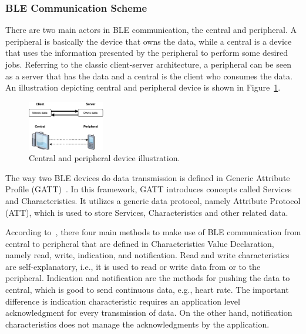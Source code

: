 \documentclass[journal]{vgtc}                %
\begin{document}


\subsubsection{BLE Communication Scheme} %
\label{ssub:ble_communication_scheme}
There are two main actors in BLE communication, the central and peripheral.  A peripheral is basically the device that owns the data, while a central is a device that uses the information presented by the peripheral to perform some desired jobs. Referring to the classic client-server architecture, a peripheral can be seen as a server that has the data and a central is the client who consumes the data. An illustration depicting central and peripheral device is shown in Figure~\ref{fig:central-peripheral}.

\begin{figure}[h!]
  \centering
    \includegraphics[width=0.3\textwidth]{central-peripheral}
  \caption{Central and peripheral device illustration.}
  \label{fig:central-peripheral}
\end{figure}

The way two BLE devices do data transmission is defined in Generic Attribute Profile (GATT)~\cite{BluetoothSpecialInterestGroup2014}. In this framework, GATT introduces concepts called Services and Characteristics. It utilizes a generic data protocol, namely Attribute Protocol (ATT), which is used to store Services, Characteristics and other related data.

According to~\cite{BluetoothSpecialInterestGroup2014}, there four main methods to make use of BLE communication from central to peripheral that are defined in Characteristics Value Declaration, namely read, write, indication, and notification. Read and write characteristics are self-explanatory, i.e., it is used to read or write data from or to the peripheral. Indication and notification are the methods for pushing the data to central, which is good to send continuous data, e.g., heart rate. The important difference is indication characteristic requires an application level acknowledgment for every transmission of data. On the other hand, notification characteristics does not manage the acknowledgments by the application.
\end{document}
